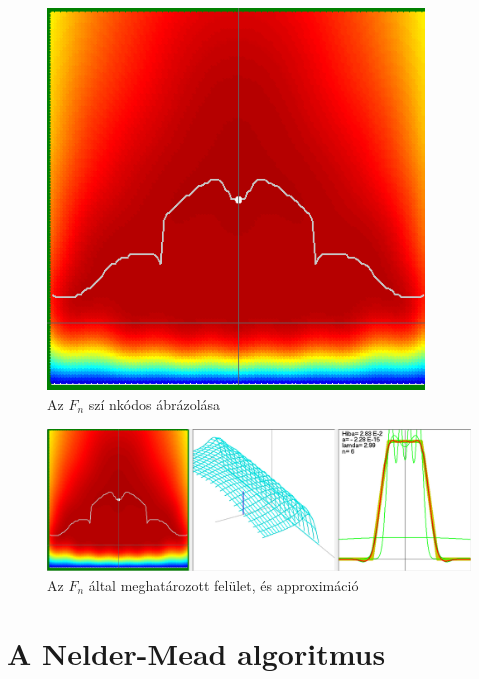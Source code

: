 \documentclass[oneside,titlepage,12pt,a4paper]{report}
\begin{document}
\begin{figure}[H]
\begin{center}
   \includegraphics[width=100mm]{./Abrak/Ereszkedo1/F_2sz.png}
  \caption{Az $F_n$ szí nkódos ábrázolása}
\end{center}
\end{figure}

\begin{figure}[H]
\begin{center}
   \includegraphics[width=140mm]{./Abrak/Ereszkedo1/Er36.png}
  \caption{Az $F_n$ által meghatározott felület, és approximáció}
\end{center}
\end{figure}

\section{A Nelder-Mead algoritmus}
\end{document}
